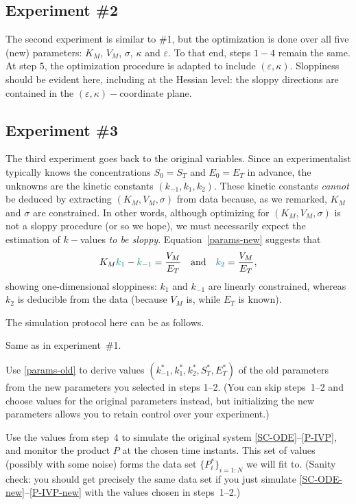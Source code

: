 \documentclass{article}
\newcommand{\eps}{\varepsilon}
\begin{document}
\subsection{Experiment \#2}
%
The second experiment is similar to \#1,
but the optimization is done over all five (new) parameters:
$K_M$, $V_M$, $\sigma$, $\kappa$ and $\eps$.
To that end, steps $1-4$ remain the same.
At step $5$, the optimization procedure is adapted
to include $(\eps,\kappa)$.
Sloppiness should be evident here, including at the Hessian level:
the sloppy directions are contained in
the $(\eps,\kappa)-$coordinate plane.

\subsection{Experiment \#3}
%
The third experiment goes back to the original variables.
Since an experimentalist typically knows
the concentrations $S_0=S_T$ and $E_0=E_T$ in advance,
the unknowns are the kinetic constants $(k_{-1},k_1,k_2)$.
These kinetic constants \textit{cannot} be deduced
by extracting $(K_M,V_M,\sigma)$ from data because,
as we remarked, $K_M$ and $\sigma$ are constrained.
In other words, although optimizing for $(K_M,V_M,\sigma)$
is not a sloppy procedure (or so we hope),
we must necessarily expect
the estimation of $k-$values \textit{to be sloppy}.
Equation~\eqref{params-new} suggests that
%
\[
 K_M \textcolor{teal}{k_1} - \textcolor{teal}{k_{-1}}
=
 \frac{V_M}{E_T}
\quad\mbox{and}\quad
 \textcolor{teal}{k_2}
=
 \frac{V_M}{E_T} ,
\]
%
showing one-dimensional sloppiness:
$k_1$ and $k_{-1}$ are linearly constrained,
whereas $k_2$ is deducible from the data
(because $V_M$ is, while $E_T$ is known).

The simulation protocol here can be as follows.

Same as in experiment~\#1.

Use \eqref{params-old} to derive values
$(k_{-1}^*,k_1^*,k_2^*,S_T^*,E_T^*)$
of the old parameters
from the new parameters you selected in steps 1--2.
(You can skip steps~1--2 and choose values
for the original parameters instead,
but initializing the new parameters
allows you to retain control over your experiment.)

Use the values from step~4 to simulate 
the original system \eqref{SC-ODE}--\eqref{P-IVP},
and monitor the product $P$ at the chosen time instants.
This set of values (possibly with some noise)
forms the data set $\{P^*_i\}_{i=1:N}$ we will fit to.
(Sanity check: you should get precisely the same data set
if you just simulate \eqref{SC-ODE-new}--\eqref{P-IVP-new}
with the values chosen in steps~1--2.)
\end{document}
